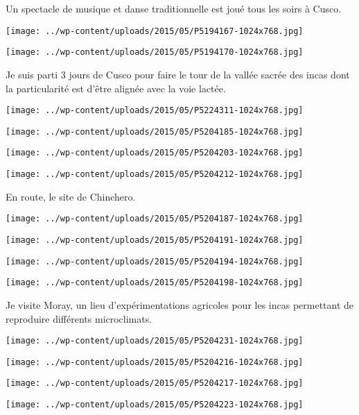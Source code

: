 Un spectacle de musique et danse traditionnelle est joué tous les soirs à Cusco. 
\begin{center} \texttt{[image: ../wp-content/uploads/2015/05/P5194167-1024x768.jpg]} \end{center}
\begin{center} \texttt{[image: ../wp-content/uploads/2015/05/P5194170-1024x768.jpg]} \end{center}

Je suis parti 3 jours de Cusco pour faire le tour de la vallée sacrée des incas dont la particularité est d'être alignée avec la voie lactée. 
\begin{center} \texttt{[image: ../wp-content/uploads/2015/05/P5224311-1024x768.jpg]} \end{center}
\begin{center} \texttt{[image: ../wp-content/uploads/2015/05/P5204185-1024x768.jpg]} \end{center}
\begin{center} \texttt{[image: ../wp-content/uploads/2015/05/P5204203-1024x768.jpg]} \end{center}
\begin{center} \texttt{[image: ../wp-content/uploads/2015/05/P5204212-1024x768.jpg]} \end{center}

En route, le site de Chinchero. 
\begin{center} \texttt{[image: ../wp-content/uploads/2015/05/P5204187-1024x768.jpg]} \end{center}
\begin{center} \texttt{[image: ../wp-content/uploads/2015/05/P5204191-1024x768.jpg]} \end{center}
\begin{center} \texttt{[image: ../wp-content/uploads/2015/05/P5204194-1024x768.jpg]} \end{center}
\begin{center} \texttt{[image: ../wp-content/uploads/2015/05/P5204198-1024x768.jpg]} \end{center}

Je visite Moray, un lieu d'expérimentations agricoles pour les incas permettant de reproduire différents microclimats. 
\begin{center} \texttt{[image: ../wp-content/uploads/2015/05/P5204231-1024x768.jpg]} \end{center}
\begin{center} \texttt{[image: ../wp-content/uploads/2015/05/P5204216-1024x768.jpg]} \end{center}
\begin{center} \texttt{[image: ../wp-content/uploads/2015/05/P5204217-1024x768.jpg]} \end{center}
\begin{center} \texttt{[image: ../wp-content/uploads/2015/05/P5204223-1024x768.jpg]} \end{center}

